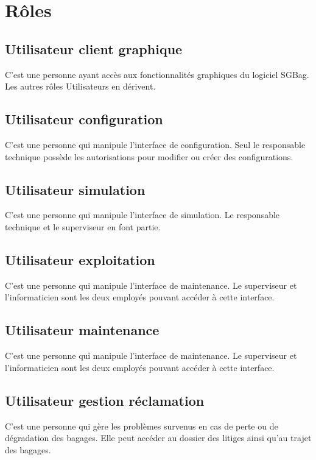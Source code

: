 \section{Rôles}

\subsection{Utilisateur client graphique}
\label{uiUser}
C'est une personne ayant accès aux fonctionnalités graphiques du logiciel SGBag. Les autres rôles \og Utilisateurs \fg en dérivent.

\subsection{Utilisateur configuration}
\label{confUser}
C'est une personne qui manipule l'interface de configuration. Seul le responsable technique possède les autorisations pour modifier ou créer des configurations.

\subsection{Utilisateur simulation}
\label{simUser}
C'est une personne qui manipule l'interface de simulation. Le responsable technique et le superviseur en font partie.

\subsection{Utilisateur exploitation}
\label{expUser}
C'est une personne qui manipule l'interface de maintenance. Le superviseur et l'informaticien sont les deux employés pouvant accéder à cette interface.

\subsection{Utilisateur maintenance}
\label{mntUser}
C'est une personne qui manipule l'interface de maintenance. Le superviseur et l'informaticien sont les deux employés pouvant accéder à cette interface.

\subsection{Utilisateur gestion réclamation}
\label{recUser}
C'est une personne qui gère les problèmes survenus en cas de perte ou de dégradation des bagages. Elle peut accéder au dossier des litiges ainsi qu'au trajet des bagages.

